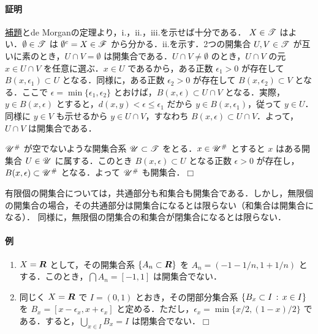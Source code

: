 \documentclass[pandoc,base=10pt,b5j,precisetext]{bxjsarticle}
\providecommand{\tightlist}{%
  \setlength{\itemsep}{0pt}\setlength{\parskip}{0pt}}
\let\oldparagraph\paragraph
\renewcommand{\paragraph}[1]{\oldparagraph{#1}\mbox{}}
\def\lt{<}
\begin{document}
\hypertarget{ux8a3cux660e-1}{%
\paragraph{証明}\label{ux8a3cux660e-1}}

\protect\hyperlink{open-closed-duality}{補題}とde
Morganの定理より，i.，ii.，iii.を示せば十分である． \(X \in \mathscr{T}\)
はよい．\(\emptyset \in \mathscr{T}\) は \(\emptyset^c = X \in \mathscr{F}\)
から分かる．ii.を示す．2つの開集合 \(U, V \in \mathscr{T}\)
が互いに素のとき，\(U \cap V = \emptyset\)
は開集合である．\(U \cap V \neq \emptyset\) のとき，\(U \cap V\) の元
\(x \in U \cap V\) を任意に選ぶ．\(x \in U\) であるから，ある正数
\(\epsilon_1 > 0\) が存在して \(B(x, \epsilon_1) \subset U\)
となる．同様に，ある正数 \(\epsilon_2 > 0\) が存在して
\(B(x, \epsilon_2) \subset V\) となる．ここで
\(\epsilon = \min \{ \epsilon_1, \epsilon_2 \}\)
とおけば，\(B(x, \epsilon) \subset U \cap V\)
となる．実際，\(y \in B(x, \epsilon)\)
とすると，\(d(x, y) \lt \epsilon \le \epsilon_1\) だから
\(y \in B(x, \epsilon_1)\)，従って \(y \in U\)．同様に \(y \in V\)
も示せるから \(y \in U \cap V\)，すなわち
\(B(x, \epsilon) \subset U \cap V\)．よって，\(U \cap V\)
は開集合である．

\(\mathscr{U}^\#\) が空でないような開集合系 \(\mathscr{U} \subset \mathscr{T}\)
をとる．\(x \in \mathscr{U}^\#\) とすると \(x\) はある開集合 \(U \in \mathscr{U}\)
に属する．このとき \(B(x, \epsilon) \subset U\) となる正数
\(\epsilon > 0\) が存在し，\(B(x, \epsilon) \subset \mathscr{U}^\#\)
となる．よって \(\mathscr{U}^\#\) も開集合．\(\Box\)

有限個の開集合については，共通部分も和集合も開集合である．しかし，無限個の開集合の場合，その共通部分は開集合になるとは限らない（和集合は開集合になる）．
同様に，無限個の閉集合の和集合が閉集合になるとは限らない．

\hypertarget{ux4f8b-2}{%
\paragraph{例}\label{ux4f8b-2}}

\begin{enumerate}
\def\labelenumi{\roman{enumi})}
\tightlist
\item
  \(X = \boldsymbol{R}\) として，その開集合系 \(\{ A_n \subset \boldsymbol{R} \}\) を
  \(A_n = (-1 - 1/n, 1 + 1/n)\)
  とする．このとき，\(\bigcap A_n = [-1, 1]\) は開集合でない．
\item
  同じく \(X = \boldsymbol{R}\) で \(I = (0, 1)\) とおき，その閉部分集合系
  \(\{ B_x \subset I \,:\, x \in I \}\) を
  \(B_x = [x - \epsilon_x , x + \epsilon_x]\)
  と定める．ただし，\(\epsilon_x = \min \{ x/2, (1-x)/2 \}\)
  である．すると，\(\bigcup_{x \in I} B_x = I\) は閉集合でない．\(\Box\)
\end{enumerate}
\end{document}
